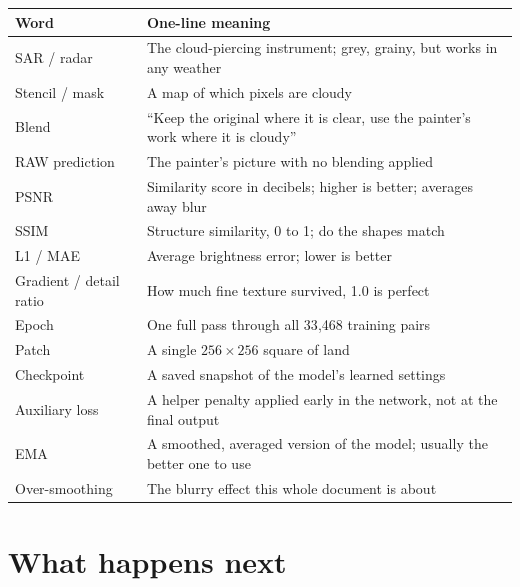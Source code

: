 \documentclass[11pt,a4paper]{article}
\begin{document}
\begin{center}
\begin{tabular}{@{}lp{9.6cm}@{}}
\hline
\textbf{Word} & \textbf{One-line meaning} \\
\hline
SAR / radar & The cloud-piercing instrument; grey, grainy, but works in any weather \\
Stencil / mask & A map of which pixels are cloudy \\
Blend & ``Keep the original where it is clear, use the painter's work where it is cloudy'' \\
RAW prediction & The painter's picture with no blending applied \\
PSNR & Similarity score in decibels; higher is better; averages away blur \\
SSIM & Structure similarity, 0 to 1; do the shapes match \\
L1 / MAE & Average brightness error; lower is better \\
Gradient / detail ratio & How much fine texture survived, 1.0 is perfect \\
Epoch & One full pass through all 33{,}468 training pairs \\
Patch & A single $256\times256$ square of land \\
Checkpoint & A saved snapshot of the model's learned settings \\
Auxiliary loss & A helper penalty applied early in the network, not at the final output \\
EMA & A smoothed, averaged version of the model; usually the better one to use \\
Over-smoothing & The blurry effect this whole document is about \\
\hline
\end{tabular}
\end{center}

\section{What happens next}
\end{document}
